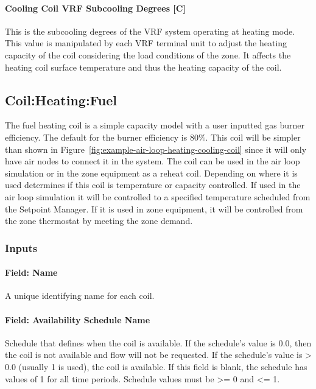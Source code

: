 \paragraph{Cooling Coil VRF Subcooling Degrees {[}C{]}}\label{cooling-coil-vrf-subcooling-degrees-c}

This is the subcooling degrees of the VRF system operating at heating mode. This value is manipulated by each VRF terminal unit to adjust the heating capacity of the coil considering the load conditions of the zone. It affects the heating coil surface temperature and thus the heating capacity of the coil.

\subsection{Coil:Heating:Fuel}\label{coilheatinggas-000}

The fuel heating coil is a simple capacity model with a user inputted gas burner efficiency. The default for the burner efficiency is 80\%. This coil will be simpler than shown in Figure~\ref{fig:example-air-loop-heating-cooling-coil} since it will only have air nodes to connect it in the system. The coil can be used in the air loop simulation or in the zone equipment as a reheat coil. Depending on where it is used determines if this coil is temperature or capacity controlled. If used in the air loop simulation it will be controlled to a specified temperature scheduled from the Setpoint Manager. If it is used in zone equipment, it will be controlled from the zone thermostat by meeting the zone demand.

\subsubsection{Inputs}\label{inputs-10-006}

\paragraph{Field: Name}\label{field-name-9-006}

A unique identifying name for each coil.

\paragraph{Field: Availability Schedule Name}\label{field-availability-schedule-name-4-003}

Schedule that defines when the coil is available. If the schedule's value is 0.0, then the coil is not available and flow will not be requested. If the schedule's value is \textgreater{} 0.0 (usually 1 is used), the coil is available. If this field is blank, the schedule has values of 1 for all time periods. Schedule values must be \textgreater{}= 0 and \textless{}= 1.

